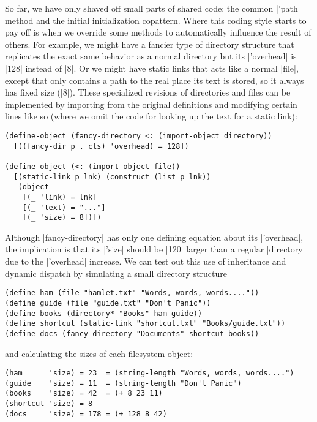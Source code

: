 So far, we have only shaved off small parts of shared code: the common \scm|'path| method and the initial initialization copattern.
Where this coding style starts to pay off is when we override some methods to automatically influence the result of others.
For example, we might have a fancier type of directory structure that replicates the exact same behavior as a normal directory but its \scm|'overhead| is \scm|128| instead of \scm|8|.
Or we might have static links that acts like a normal \scm|file|, except that only contains a path to the real place its text is stored, so it always has fixed size (\scm|8|).
These specialized revisions of directories and files can be implemented by importing from the original definitions and modifying certain lines like so (where we omit the code for looking up the text for a static link):
\begin{verbatim}
(define-object (fancy-directory <: (import-object directory))
  [((fancy-dir p . cts) 'overhead) = 128])

(define-object (<: (import-object file))
  [(static-link p lnk) (construct (list p lnk))
   (object
    [(_ 'link) = lnk]
    [(_ 'text) = "..."]
    [(_ 'size) = 8])])
\end{verbatim}
Although \scm|fancy-directory| has only one defining equation about its \scm|'overhead|, the implication is that its \scm|'size| should be \scm|120| larger than a regular \scm|directory| due to the \scm|'overhead| increase.
We can test out this use of inheritance and dynamic dispatch by simulating a small directory structure
\begin{verbatim}
(define ham (file "hamlet.txt" "Words, words, words...."))
(define guide (file "guide.txt" "Don't Panic"))
(define books (directory* "Books" ham guide))
(define shortcut (static-link "shortcut.txt" "Books/guide.txt"))
(define docs (fancy-directory "Documents" shortcut books))
\end{verbatim}
and calculating the sizes of each filesystem object:
\begin{verbatim}
(ham      'size) = 23  = (string-length "Words, words, words....")
(guide    'size) = 11  = (string-length "Don't Panic")
(books    'size) = 42  = (+ 8 23 11)
(shortcut 'size) = 8
(docs     'size) = 178 = (+ 128 8 42)
\end{verbatim}

